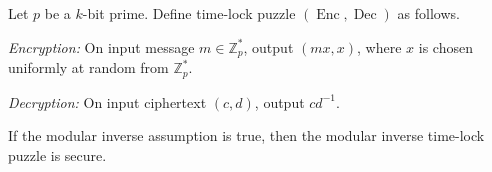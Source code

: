 \documentclass{article}
\newcommand{\Enc}{\operatorname{Enc}}
\newcommand{\Dec}{\operatorname{Dec}}
\newcommand{\Zp}{\mathbb{Z}^*_p}
\begin{document}


\begin{protocol}
  Let $p$ be a $k$-bit prime.
  Define time-lock puzzle $(\Enc, \Dec)$ as follows.

  \emph{Encryption:} On input message $m \in \Zp$, output $(mx, x)$, where $x$ is chosen uniformly at random from $\Zp$.

  \emph{Decryption:} On input ciphertext $(c, d)$, output $cd^{-1}$.
\end{protocol}

\begin{conjecture}
  If the modular inverse assumption is true, then the modular inverse time-lock puzzle is secure.
\end{conjecture}

\end{document}
